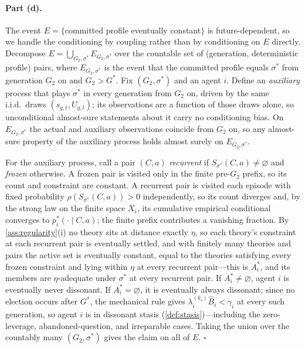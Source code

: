 \documentclass[11pt]{article}
\theoremstyle{definition}
\newcommand{\emptysetset}{\varnothing}
\begin{document}
\paragraph{Part (d).}
The event $E=\{$committed profile eventually constant$\}$ is future-dependent,
so we handle the conditioning by coupling rather than by conditioning on $E$
directly.  Decompose $E=\bigcup_{G_2,\sigma^{*}}E_{G_2,\sigma^{*}}$ over the
countable set of (generation, deterministic profile) pairs, where
$E_{G_2,\sigma^{*}}$ is the event that the committed profile equals
$\sigma^{*}$ from generation $G_2$ on and $G_2>G^{*}$.  Fix
$(G_2,\sigma^{*})$ and an agent $i$.  Define an \emph{auxiliary} process that
plays $\sigma^{*}$ in every generation from $G_2$ on, driven by the same
i.i.d.\ draws $(s_{g,t},U_{g,t})$; its observations are a function of those
draws alone, so unconditional almost-sure statements about it carry no
conditioning bias.  On $E_{G_2,\sigma^{*}}$ the actual and auxiliary
observations coincide from $G_2$ on, so any almost-sure property of the
auxiliary process holds almost surely on $E_{G_2,\sigma^{*}}$.

For the auxiliary process, call a pair $(C,a)$ \emph{recurrent} if
$S_{\sigma^{*}}(C,a)\neq\emptysetset$ and \emph{frozen} otherwise.  A frozen
pair is visited only in the finite pre-$G_2$ prefix, so its count and
constraint are constant.  A recurrent pair is visited each episode with fixed
probability $\rho(S_{\sigma^{*}}(C,a))>0$ independently, so its count diverges
and, by the strong law on the finite space $X_i$, its cumulative empirical
conditional converges to $p_i^{*}(\cdot\mid C,a)$; the finite prefix
contributes a vanishing fraction.  By \cref{ass:regularity}(i) no theory sits
at distance exactly $\eta$, so each theory's constraint at each recurrent pair
is eventually settled, and with finitely many theories and pairs the active
set is eventually constant, equal to the theories satisfying every frozen
constraint and lying within $\eta$ at every recurrent pair---this is
$A_i^{*}$, and its members are $\eta$-adequate under $\sigma^{*}$ at every
recurrent pair.  If $A_i^{*}\neq\emptysetset$, agent $i$ is eventually never
dissonant.  If $A_i^{*}=\emptysetset$, it is eventually always dissonant;
since no election occurs after $G^{*}$, the mechanical rule gives
$\lambda_i^{(k_i)}\widehat B_i<\gamma_i$ at every such generation, so agent
$i$ is in dissonant stasis (\cref{def:stasis})---including the zero-leverage,
abandoned-question, and irreparable cases.  Taking the union over the
countably many $(G_2,\sigma^{*})$ gives the claim on all of $E$.
\hfill$\square$
\end{document}
